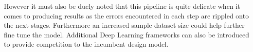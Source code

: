 \documentclass[final,1p,times,twocolumn]{elsarticle}
\begin{document}
However it must also be duely noted that this pipeline is quite delicate when it comes to producing results as the errors encountered in each step are rippled onto the next stages. Furthermore an increased sample dataset size could help further fine tune the model. Additional Deep Learning frameworks can also be introduced to provide competition to the incumbent design model.  
% 
% 
\end{document}
